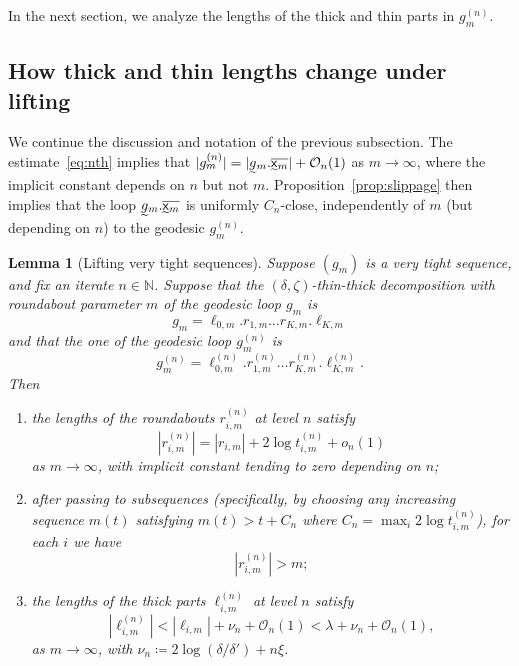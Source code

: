 \documentclass{amsart}
\newcommand\N{{\mathbb{N}}}
\newtheorem{lem}[thm]{Lemma}
\theoremstyle{definition}
\theoremstyle{remark}
\newcommand{\sfx}{{\sf x}}
\begin{document}
In the next section, we analyze the lengths of the thick and thin parts in $g_m^{(n)}$.  

\subsection{How thick and thin lengths change under lifting}\label{subsecn:change}
We continue the discussion and notation of the previous subsection.
The estimate~\eqref{eq:nth} implies that $|g_m^{(n)}| = |\undertilde{g}_m.\overline{\undertilde{\sfx}_m}|+\mathcal O_n(1)$ as $m\to\infty$, where the implicit constant depends on $n$ but not $m$.  Proposition~\ref{prop:slippage} then implies that the loop $\undertilde{g}_m.\overline{\undertilde{\sfx}_m}$ is uniformly $C_n$-close, independently of $m$ (but depending on $n$) to the geodesic $g_m^{(n)}$.



\begin{lem}[Lifting very tight sequences]\label{lem:tightlift}
  Suppose $(g_m)$ is a very tight sequence, and fix an iterate $n\in \N$.  Suppose that the $(\delta, \zeta)$-thin-thick decomposition with roundabout parameter $m$ of the geodesic loop $g_m$ is
  \[ g_m=\ell_{0,m}.r_{1,m}\ldots r_{K,m}.\ell_{K,m}\]
  and that the one of the geodesic loop $g_m^{(n)}$ is
    \[g_m^{(n)}=\ell_{0,m}^{(n)}.r_{1,m}^{(n)}\ldots r_{K,m}^{(n)}.\ell_{K,m}^{(n)}.\]
Then
\begin{enumerate}
\item the lengths of the roundabouts $r_{i,m}^{(n)}$ at level $n$ satisfy 
\[ |r_{i,m}^{(n)}| = |r_{i,m}| + 2\log t^{(n)}_{i,m} + o_n(1)\]
as $m\to\infty$, with implicit constant tending to zero depending on $n$;
\item after passing to subsequences (specifically, by choosing any increasing sequence $m(t)$ satisfying  $m(t)>t+C_n$ where $C_n=\max_i 2\log t^{(n)}_{i,m}$), for each $i$ we have
\[ |r_{i,m}^{(n)}| > m;\]
\item the lengths of the thick parts $\ell_{i,m}^{(n)}$ at level $n$ satisfy
\[ |\ell_{i,m}^{(n)}| < |\ell_{i,m}|+\nu_n+\mathcal O_n(1)<\lambda+\nu_n+\mathcal O_n(1),\]
as $m\to\infty$, with $\nu_n\coloneqq2\log(\delta/\delta')+n\xi$.
\end{enumerate}
\end{lem}
\end{document}
